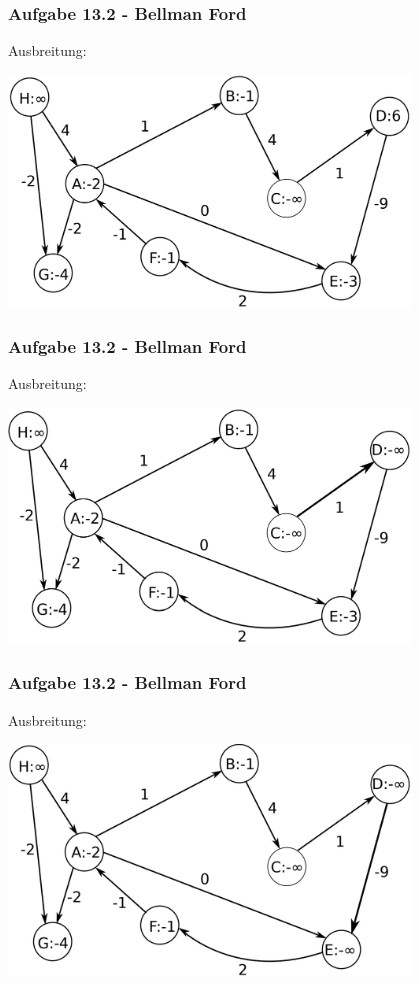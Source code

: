 \documentclass{beamer}
\begin{document}
\begin{frame}
	\frametitle{Aufgabe 13.2 - Bellman Ford}
	Ausbreitung:
	\begin{center}
		\includegraphics[width=0.8\textwidth]{images/bellman_ford_i1.png}
	\end{center}
\end{frame}

\begin{frame}
	\frametitle{Aufgabe 13.2 - Bellman Ford}
	Ausbreitung:
	\begin{center}
		\includegraphics[width=0.8\textwidth]{images/bellman_ford_i2.png}
	\end{center}
\end{frame}

\begin{frame}
	\frametitle{Aufgabe 13.2 - Bellman Ford}
	Ausbreitung:
	\begin{center}
		\includegraphics[width=0.8\textwidth]{images/bellman_ford_i3.png}
	\end{center}
\end{frame}
\end{document}
